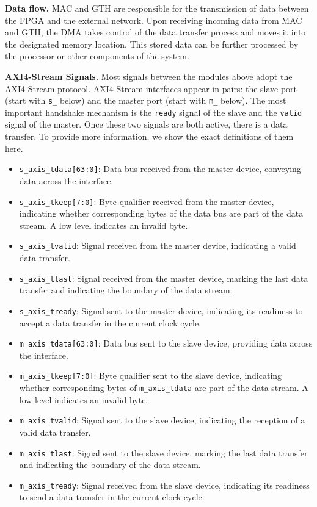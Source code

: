     \textbf{Data flow.} MAC and GTH are responsible for the transmission of data between the FPGA and the external network. Upon receiving incoming data from MAC and GTH, the DMA takes control of the data transfer process and moves it into the designated memory location. This stored data can be further processed by the processor or other components of the system.

    \textbf{AXI4-Stream Signals.} Most signals between the modules above adopt the AXI4-Stream protocol. AXI4-Stream interfaces appear in pairs: the slave port (start with \verb|s_| below) and the master port (start with \verb|m_| below). 
    The most important handshake mechanism is the \verb|ready| signal of the slave and the \verb|valid| signal of the master. Once these two signals are both active, there is a data transfer. To provide more information, we show the exact definitions of them here.

    \begin{itemize}
        \item {\verb|s_axis_tdata[63:0]|}: Data bus received from the master device, conveying data across the interface.
        \item {\verb|s_axis_tkeep[7:0]|}: Byte qualifier received from the master device, indicating whether corresponding bytes of the data bus are part of the data stream. A low level indicates an invalid byte.
        \item {\verb|s_axis_tvalid|}: Signal received from the master device, indicating a valid data transfer.
        \item {\verb|s_axis_tlast|}: Signal received from the master device, marking the last data transfer and indicating the boundary of the data stream.
        \item {\verb|s_axis_tready|}: Signal sent to the master device, indicating its readiness to accept a data transfer in the current clock cycle.
        \item {\verb|m_axis_tdata[63:0]|}: Data bus sent to the slave device, providing data across the interface.
        \item {\verb|m_axis_tkeep[7:0]|}: Byte qualifier sent to the slave device, indicating whether corresponding bytes of \verb|m_axis_tdata| are part of the data stream. A low level indicates an invalid byte.
        \item {\verb|m_axis_tvalid|}: Signal sent to the slave device, indicating the reception of a valid data transfer.
        \item {\verb|m_axis_tlast|}: Signal sent to the slave device, marking the last data transfer and indicating the boundary of the data stream.
        \item {\verb|m_axis_tready|}: Signal received from the slave device, indicating its readiness to send a data transfer in the current clock cycle.
    \end{itemize}
    

